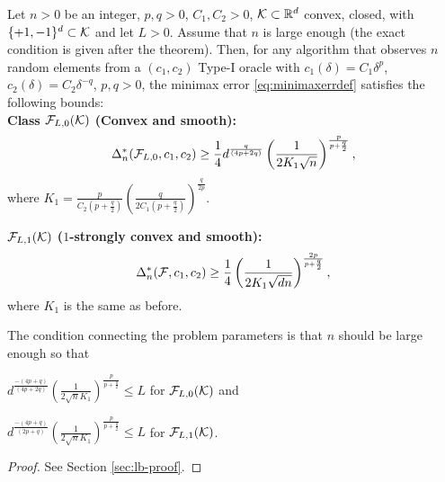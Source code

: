 \begin{theorem}
\label{thm:lb-convex}
Let $n>0$ be an integer, $p,q>0$, $C_1,C_2>0$, 
$\mathcal{K}\subset \mathbb{R}^d$ convex, closed, with  $\{+1,-1\}^d\subset \mathcal{K}$ and let $L>0$.
Assume that $n$ is large enough (the exact condition is given after the theorem). 
Then, for any algorithm that observes $n$ random elements from a $(c_1,c_2)$ Type-I oracle 
 with $c_1(\delta) = C_1 \delta^p$, $c_2(\delta) = C_2 \delta^{-q}$, $p,q>0$,
 the minimax error \eqref{eq:minimaxerrdef} satisfies the following bounds:\\
\textbf{Class $\mathcal{F}_{L,0}(\mathcal{K})$ (Convex and smooth):}
\[
\Delta_n^{*}(\mathcal{F}_{L,0}, c_1,c_2) \ge \dfrac{1}{4}d^{\frac{q}{(4p+2q)}}\left(\dfrac{1}{2 K_1 \sqrt n}\right)^{\frac{p}{p+\frac{q}{2}}},
\]
where $K_1 = \frac{p}{C_2(p+\tfrac{q}{2})} \left(\frac{q}{2C_1(p+\tfrac{q}{2})}\right)^{\frac{q}{2p}}$.

\textbf{$\mathcal{F}_{L,1}(\mathcal{K})$ ($1$-strongly convex and smooth):}
\[
\Delta_n^{*}(\mathcal{F}, c_1,c_2) \ge \dfrac{1}{4}  \left(\dfrac{1}{2 K_1 \sqrt {d n}}\right)^{\frac{2p}{p+\frac{q}{2}}}, 
\]
where $K_1$ is the same as before.
\end{theorem}
The condition connecting the problem parameters is that $n$ should be large enough so that\\
\begin{inparaenum}[\bfseries (i)]
\item $d^{\frac{-(4p+q)}{(4p+2q)}}\left(\frac{1}{2\sqrt{n} K_1} \right)^{\frac{p}{p+\frac{q}{2}}}\le L$ for $\mathcal{F}_{L,0}(\mathcal{K})$ and\\
\item $d^{\frac{-(4p+q)}{(2p+q)}}\left(\frac{1}{2\sqrt{n} K_1} \right)^{\frac{p}{p+\frac{q}{2}}} \le L$ for $\mathcal{F}_{L,1}(\mathcal{K})$.
\end{inparaenum}
\begin{proof}
 See Section \ref{sec:lb-proof}.
\end{proof}


